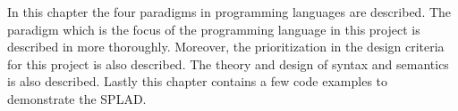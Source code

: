 In this chapter the four paradigms in programming languages are described. The paradigm which is the focus of the programming language in this project is described in more thoroughly. Moreover, the prioritization in the design criteria for this project is also described. The theory and design of syntax and semantics is also described. Lastly this chapter contains a few code examples to demonstrate the SPLAD. 